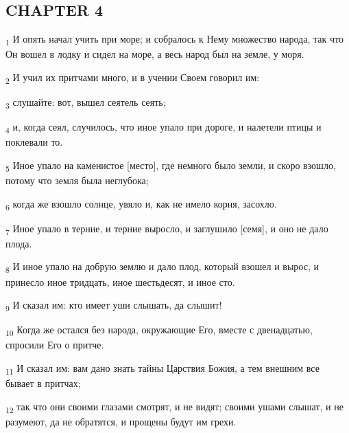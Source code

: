 \subsection{CHAPTER 4}
\begin{tcolorbox}
\textsubscript{1} И опять начал учить при море; и собралось к Нему множество народа, так что Он вошел в лодку и сидел на море, а весь народ был на земле, у моря.
\end{tcolorbox}
\begin{tcolorbox}
\textsubscript{2} И учил их притчами много, и в учении Своем говорил им:
\end{tcolorbox}
\begin{tcolorbox}
\textsubscript{3} слушайте: вот, вышел сеятель сеять;
\end{tcolorbox}
\begin{tcolorbox}
\textsubscript{4} и, когда сеял, случилось, что иное упало при дороге, и налетели птицы и поклевали то.
\end{tcolorbox}
\begin{tcolorbox}
\textsubscript{5} Иное упало на каменистое [место], где немного было земли, и скоро взошло, потому что земля была неглубока;
\end{tcolorbox}
\begin{tcolorbox}
\textsubscript{6} когда же взошло солнце, увяло и, как не имело корня, засохло.
\end{tcolorbox}
\begin{tcolorbox}
\textsubscript{7} Иное упало в терние, и терние выросло, и заглушило [семя], и оно не дало плода.
\end{tcolorbox}
\begin{tcolorbox}
\textsubscript{8} И иное упало на добрую землю и дало плод, который взошел и вырос, и принесло иное тридцать, иное шестьдесят, и иное сто.
\end{tcolorbox}
\begin{tcolorbox}
\textsubscript{9} И сказал им: кто имеет уши слышать, да слышит!
\end{tcolorbox}
\begin{tcolorbox}
\textsubscript{10} Когда же остался без народа, окружающие Его, вместе с двенадцатью, спросили Его о притче.
\end{tcolorbox}
\begin{tcolorbox}
\textsubscript{11} И сказал им: вам дано знать тайны Царствия Божия, а тем внешним все бывает в притчах;
\end{tcolorbox}
\begin{tcolorbox}
\textsubscript{12} так что они своими глазами смотрят, и не видят; своими ушами слышат, и не разумеют, да не обратятся, и прощены будут им грехи.
\end{tcolorbox}
